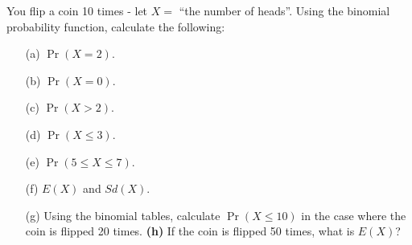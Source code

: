 
You flip a coin 10 times - let $X =$ ``the number of heads''. Using the binomial probability function, calculate the following:\\[-0.2cm]
\begin{itemize}
\item[(a)] $\Pr(X = 2)$.  \item[(b)] $\Pr(X = 0)$.  \item[(c)]  $\Pr(X > 2)$.  \item[(d)] $\Pr(X \le 3)$.  \item[(e)] $\Pr(5 \le X \le 7)$.   \item[(f)] $E(X)$ and $Sd(X)$.  \item[(g)] Using the binomial tables, calculate $\Pr(X \le10)$ in the case where the coin is flipped 20 times.  {\bf(h)} If the coin is flipped 50 times, what is $E(X)$?
\end{itemize}



